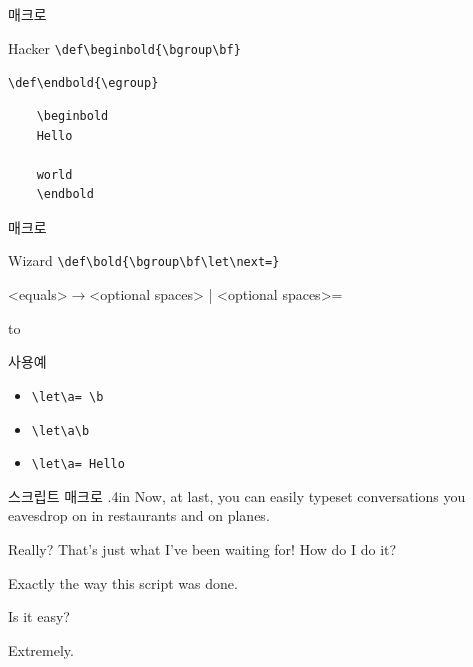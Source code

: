 \documentclass{beamer}
\begin{document}
%
\begin{frame}[fragile]{\texttt{\string\bold} 매크로}
  \begin{alertblock}{Hacker}
    \verb+\def\beginbold{\bgroup\bf}+
    
    \verb+\def\endbold{\egroup}+
  \end{alertblock}

  \begin{verbatim}
    \beginbold
    Hello

    world
    \endbold
  \end{verbatim}
\end{frame}


%
\begin{frame}[fragile]{\texttt{\string\bold} 매크로}
  \begin{alertblock}{Wizard}
    \verb+\def\bold{\bgroup\bf\let\next=}+
  \end{alertblock}
  \medskip
  <equals>$\rightarrow$<optional spaces> | <optional spaces>=
  
  \hbox to
  \medskip

  \begin{alertblock}{사용예}
    \begin{itemize}
    \item \verb*+\let\a= \b+
    \item \verb*+\let\a\b+
    \item \verb*+\let\a= Hello+
    \end{itemize}
  \end{alertblock}
\end{frame}


%


%
\newcount\spk
\def\beginscript{\bgroup \parindent=0pt \rm \spk=1 \rightskip.4in
  \def\par{\ifnum\spk=1 \endgraf \sl \spk=2 \leftskip.4in \rightskip0in
    \else \endgraf \rm \spk=1 \leftskip0in \rightskip.4in \fi}}
\def\endscript {\egroup}

\begin{frame}[fragile]{스크립트 매크로}
  \hsize 3in
  \beginscript
  Now, at last, you can easily typeset
  conversations you eavesdrop on in
  restaurants and on planes.
  
  Really? That's just what I've been waiting
  for! How do I do it?
  
  Exactly the way this script was done.
  
  Is it easy?
  
  Extremely.
  \endscript
\end{frame}
\end{document}

